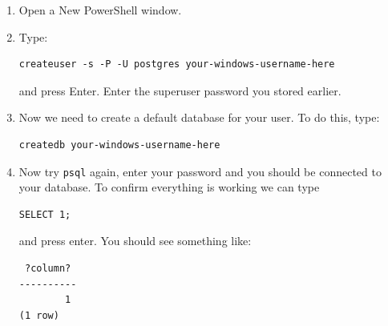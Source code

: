\documentclass{pgnotes}
\begin{document}
\begin{enumerate}

\item
	Open a New PowerShell window.

\item
  Type:
\begin{verbatim}
createuser -s -P -U postgres your-windows-username-here
\end{verbatim}
  and press Enter. 
  Enter the superuser password you stored earlier.

\item
  Now we need to create a default database for your user.
  To do this, type:
\begin{verbatim}
createdb your-windows-username-here
\end{verbatim}
	
\item 
  Now try \texttt{psql} again, enter your password and you should be connected to your database.
  To confirm everything is working we can type
\begin{verbatim}
SELECT 1;
\end{verbatim}
  and press enter.
  You should see something like:
\begin{verbatim}
 ?column?
----------
        1
(1 row)
\end{verbatim}

\end{enumerate}
\end{document}
